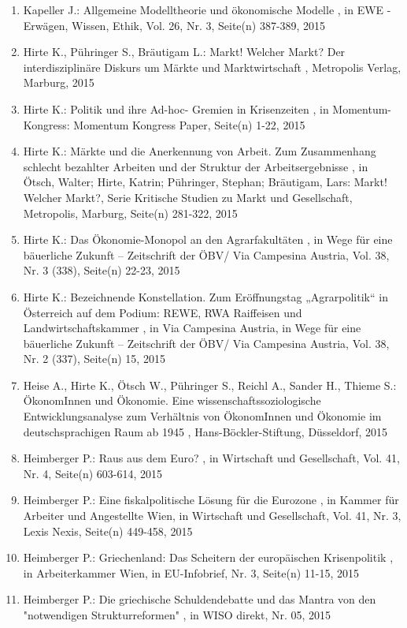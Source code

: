 \begin{enumerate}[leftmargin=*, labelsep=0.5cm]
	 \item Kapeller J.:  Allgemeine Modelltheorie und ökonomische Modelle  , in EWE - Erwägen, Wissen, Ethik, Vol. 26, Nr. 3, Seite(n) 387-389, 2015
	 \item Hirte K., Pühringer S., Bräutigam L.:  Markt! Welcher Markt? Der interdisziplinäre Diskurs um Märkte und Marktwirtschaft  , Metropolis Verlag, Marburg, 2015
	 \item Hirte K.:  Politik und ihre Ad-hoc- Gremien in Krisenzeiten  , in Momentum-Kongress: Momentum Kongress Paper, Seite(n) 1-22, 2015
	 \item Hirte K.:  Märkte und die Anerkennung von Arbeit. Zum Zusammenhang schlecht bezahlter Arbeiten und der Struktur der Arbeitsergebnisse  , in Ötsch, Walter; Hirte, Katrin; Pühringer, Stephan; Bräutigam, Lars: Markt! Welcher Markt?, Serie Kritische Studien zu Markt und Gesellschaft, Metropolis, Marburg, Seite(n) 281-322, 2015
	 \item Hirte K.:  Das Ökonomie-Monopol an den Agrarfakultäten  , in Wege für eine bäuerliche Zukunft – Zeitschrift der ÖBV/ Via Campesina Austria, Vol. 38, Nr. 3 (338), Seite(n) 22-23, 2015
	 \item Hirte K.:  Bezeichnende Konstellation. Zum Eröffnungstag „Agrarpolitik“ in Österreich auf dem Podium: REWE, RWA Raiffeisen und Landwirtschaftskammer  , in Via Campesina Austria, in Wege für eine bäuerliche Zukunft – Zeitschrift der ÖBV/ Via Campesina Austria, Vol. 38, Nr. 2 (337), Seite(n) 15, 2015
	 \item Heise A., Hirte K., Ötsch W., Pühringer S., Reichl A., Sander H., Thieme S.:  ÖkonomInnen und Ökonomie. Eine wissenschaftssoziologische Entwicklungsanalyse zum Verhältnis von ÖkonomInnen und Ökonomie im deutschsprachigen Raum ab 1945  , Hans-Böckler-Stiftung, Düsseldorf, 2015
	 \item Heimberger P.:  Raus aus dem Euro?  , in Wirtschaft und Gesellschaft, Vol. 41, Nr. 4, Seite(n) 603-614, 2015
	 \item Heimberger P.:  Eine fiskalpolitische Lösung für die Eurozone  , in Kammer für Arbeiter und Angestellte Wien, in Wirtschaft und Gesellschaft, Vol. 41, Nr. 3, Lexis Nexis, Seite(n) 449-458, 2015
	 \item Heimberger P.:  Griechenland: Das Scheitern der europäischen Krisenpolitik  , in Arbeiterkammer Wien, in EU-Infobrief, Nr. 3, Seite(n) 11-15, 2015
	 \item Heimberger P.:  Die griechische Schuldendebatte und das Mantra von den "notwendigen Strukturreformen"  , in WISO direkt, Nr. 05, 2015

\end{enumerate}
